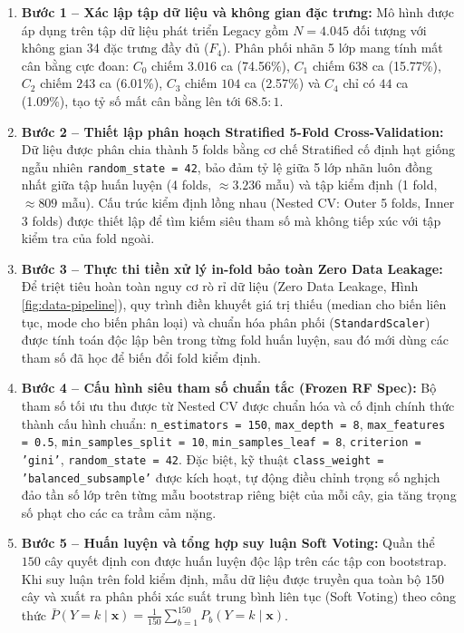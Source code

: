 \begin{enumerate}
    \item \textbf{Bước 1 -- Xác lập tập dữ liệu và không gian đặc trưng:} 
    Mô hình được áp dụng trên tập dữ liệu phát triển Legacy gồm $N = 4.045$ đối tượng với không gian 34 đặc trưng đầy đủ ($F_4$). Phân phối nhãn 5 lớp mang tính mất cân bằng cực đoan: $C_0$ chiếm $3.016$ ca (74.56\%), $C_1$ chiếm $638$ ca (15.77\%), $C_2$ chiếm $243$ ca (6.01\%), $C_3$ chiếm $104$ ca (2.57\%) và $C_4$ chỉ có $44$ ca (1.09\%), tạo tỷ số mất cân bằng lên tới $68.5:1$.
    
    \item \textbf{Bước 2 -- Thiết lập phân hoạch Stratified 5-Fold Cross-Validation:} 
    Dữ liệu được phân chia thành 5 folds bằng cơ chế Stratified cố định hạt giống ngẫu nhiên \texttt{random\_state = 42}, bảo đảm tỷ lệ giữa 5 lớp nhãn luôn đồng nhất giữa tập huấn luyện (4 folds, $\approx 3.236$ mẫu) và tập kiểm định (1 fold, $\approx 809$ mẫu). Cấu trúc kiểm định lồng nhau (Nested CV: Outer 5 folds, Inner 3 folds) được thiết lập để tìm kiếm siêu tham số mà không tiếp xúc với tập kiểm tra của fold ngoài.
    
    \item \textbf{Bước 3 -- Thực thi tiền xử lý in-fold bảo toàn Zero Data Leakage:} 
    Để triệt tiêu hoàn toàn nguy cơ rò rỉ dữ liệu (Zero Data Leakage, Hình \ref{fig:data-pipeline}), quy trình điền khuyết giá trị thiếu (median cho biến liên tục, mode cho biến phân loại) và chuẩn hóa phân phối (\texttt{StandardScaler}) được tính toán độc lập bên trong từng fold huấn luyện, sau đó mới dùng các tham số đã học để biến đổi fold kiểm định.
    
    \item \textbf{Bước 4 -- Cấu hình siêu tham số chuẩn tắc (Frozen RF Spec):} 
    Bộ tham số tối ưu thu được từ Nested CV được chuẩn hóa và cố định chính thức thành cấu hình chuẩn: \texttt{n\_estimators = 150}, \texttt{max\_depth = 8}, \texttt{max\_features = 0.5}, \texttt{min\_samples\_split = 10}, \texttt{min\_samples\_leaf = 8}, \texttt{criterion = 'gini'}, \texttt{random\_state = 42}. Đặc biệt, kỹ thuật \texttt{class\_weight = 'balanced\_subsample'} được kích hoạt, tự động điều chỉnh trọng số nghịch đảo tần số lớp trên từng mẫu bootstrap riêng biệt của mỗi cây, gia tăng trọng số phạt cho các ca trầm cảm nặng.
    
    \item \textbf{Bước 5 -- Huấn luyện và tổng hợp suy luận Soft Voting:} 
    Quần thể $150$ cây quyết định con được huấn luyện độc lập trên các tập con bootstrap. Khi suy luận trên fold kiểm định, mẫu dữ liệu được truyền qua toàn bộ $150$ cây và xuất ra phân phối xác suất trung bình liên tục (Soft Voting) theo công thức $\bar{P}(Y = k \mid \mathbf{x}) = \frac{1}{150}\sum_{b=1}^{150} P_b(Y = k \mid \mathbf{x})$.
    

\end{enumerate}
